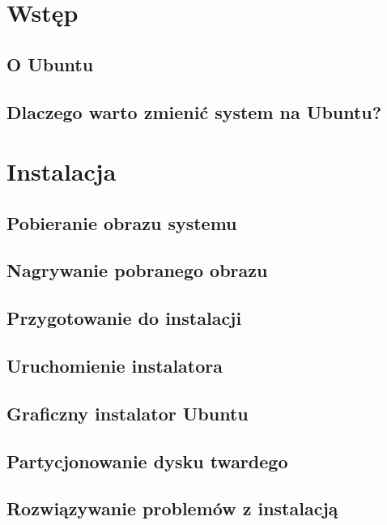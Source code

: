 \documentclass[a4paper,11pt,oneside]{mwart}
\begin{document}


\section{Wstęp}
        
        \subsection{O Ubuntu}
                
        \subsection{Dlaczego warto zmienić system na Ubuntu?}
                
\section{Instalacja}
        \subsection{Pobieranie obrazu systemu}
                
        \subsection{Nagrywanie pobranego obrazu}
                
                
        \subsection{Przygotowanie do instalacji}
                
        \subsection{Uruchomienie instalatora}
                
        \subsection{Graficzny instalator Ubuntu}
                
        \subsection{Partycjonowanie dysku twardego}
                
        \subsection{Rozwiązywanie problemów z instalacją}
                
\end{document}
